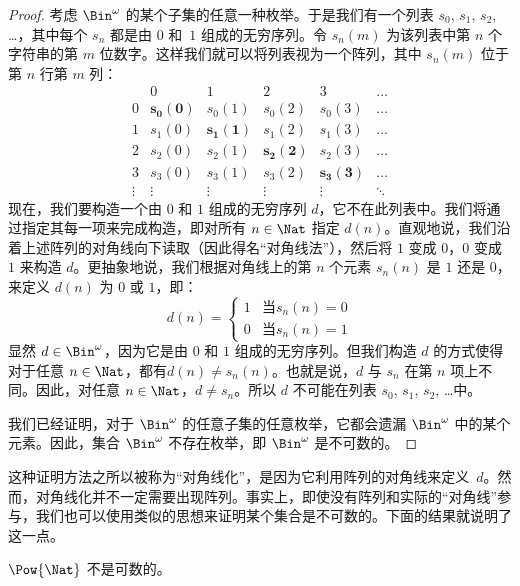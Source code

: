 \documentclass[../../../include/open-logic-section]{subfiles}
\begin{document}
\begin{proof}
考虑 $\Bin^\omega$ 的某个子集的任意一种枚举。于是我们有一个列表 $s_{0}$, $s_{1}$, $s_{2}$, \dots{}，其中每个 $s_n$ 都是由 $0$ 和~$1$ 组成的无穷序列。令 $s_n(m)$ 为该列表中第 $n$ 个字符串的第 $m$ 位数字。这样我们就可以将列表视为一个阵列，其中 $s_n(m)$ 位于第 $n$ 行第 $m$ 列：
\[
\begin{array}{c|c|c|c|c|c}
& 0 & 1 & 2 & 3 & \dots \\\hline
0 & \mathbf{s_{0}(0)} & s_{0}(1) & s_{0}(2) & s_0(3) & \dots \\\hline
1 & s_{1}(0)& \mathbf{s_{1}(1)} & s_1(2) & s_1(3) & \dots \\\hline
2 & s_{2}(0)& s_{2}(1) & \mathbf{s_2(2)} & s_2(3) & \dots \\\hline
3 & s_{3}(0)& s_{3}(1) & s_3(2) & \mathbf{s_3(3)} & \dots \\\hline
\vdots & \vdots & \vdots & \vdots & \vdots & \mathbf{\ddots}
\end{array}
\]
现在，我们要构造一个由 $0$ 和 $1$ 组成的无穷序列 $d$，它不在此列表中。我们将通过指定其每一项来完成构造，即对所有 $n \in \Nat$ 指定 $d(n)$。直观地说，我们沿着上述阵列的对角线向下读取（因此得名“对角线法”），然后将 $1$ 变成 $0$，$0$ 变成 $1$ 来构造 $d$。更抽象地说，我们根据对角线上的第 $n$ 个元素 $s_n(n)$ 是 $1$ 还是 $0$，来定义 $d(n)$ 为 $0$ 或 $1$，即：
\[
d(n) =
\begin{cases}
1 & \text{当$s_{n}(n) = 0$}\\
0 & \text{当$s_{n}(n) = 1$}
\end{cases}
\]
显然 $d \in \Bin^\omega$，因为它是由 $0$ 和 $1$ 组成的无穷序列。但我们构造 $d$ 的方式使得对于任意 $n \in \Nat$，都有$d(n) \neq s_n(n)$。也就是说，$d$ 与 $s_n$ 在第 $n$ 项上不同。因此，对任意 $n\in \Nat$，$d \neq s_n$。所以 $d$ 不可能在列表 $s_0$, $s_1$, $s_2$, \dots 中。

我们已经证明，对于 $\Bin^\omega$ 的任意子集的任意枚举，它都会遗漏 $\Bin^\omega$ 中的某个元素。因此，集合 $\Bin^\omega$ 不存在枚举，即 $\Bin^\omega$ 是不可数的。
\end{proof}

\begin{explain}
这种证明方法之所以被称为“对角线化”，是因为它利用阵列的对角线来定义~$d$。然而，对角线化并不一定需要出现阵列。事实上，即使没有阵列和实际的“对角线”参与，我们也可以使用类似的思想来证明某个集合是不可数的。下面的结果就说明了这一点。
\end{explain}

\begin{thm}
$\Pow{\Nat}$ 不是可数的。
\end{thm}
\end{document}
